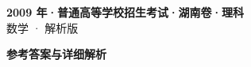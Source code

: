\documentclass[zihao=-4, a4paper]{ctexart}
\begin{document}
\begin{center}
  {\Large\bfseries 2009 年·普通高等学校招生考试·湖南卷·理科}\\[4pt]
  {\large 数学 · 解析版}
\end{center}
\medskip
{}

\clearpage
{}
\begin{center}{\Large\bfseries 参考答案与详细解析}\end{center}
\medskip

\end{document}
